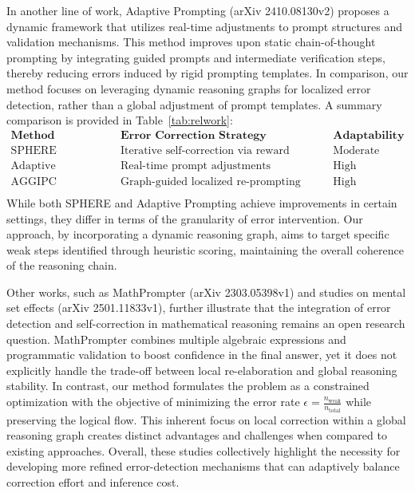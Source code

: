 \documentclass[11pt]{article}
\begin{document}
In another line of work, Adaptive Prompting (arXiv 2410.08130v2) proposes a dynamic framework that utilizes real-time adjustments to prompt structures and validation mechanisms. This method improves upon static chain-of-thought prompting by integrating guided prompts and intermediate verification steps, thereby reducing errors induced by rigid prompting templates. In comparison, our method focuses on leveraging dynamic reasoning graphs for localized error detection, rather than a global adjustment of prompt templates. A summary comparison is provided in Table~\ref{tab:relwork}:
\[
\begin{array}{lcc}
\textbf{Method} & \textbf{Error Correction Strategy} & \textbf{Adaptability} \\
\hline
\text{SPHERE} & \text{Iterative self-correction via reward updates} & \text{Moderate} \\
\text{Adaptive Prompting} & \text{Real-time prompt adjustments} & \text{High} \\
\text{AGGIPC (Proposed)} & \text{Graph-guided localized re-prompting} & \text{High} \\
\end{array}
\]
While both SPHERE and Adaptive Prompting achieve improvements in certain settings, they differ in terms of the granularity of error intervention. Our approach, by incorporating a dynamic reasoning graph, aims to target specific weak steps identified through heuristic scoring, maintaining the overall coherence of the reasoning chain.

Other works, such as MathPrompter (arXiv 2303.05398v1) and studies on mental set effects (arXiv 2501.11833v1), further illustrate that the integration of error detection and self-correction in mathematical reasoning remains an open research question. MathPrompter combines multiple algebraic expressions and programmatic validation to boost confidence in the final answer, yet it does not explicitly handle the trade-off between local re-elaboration and global reasoning stability. In contrast, our method formulates the problem as a constrained optimization with the objective of minimizing the error rate \(\epsilon = \frac{n_{\text{weak}}}{n_{\text{total}}}\) while preserving the logical flow. This inherent focus on local correction within a global reasoning graph creates distinct advantages and challenges when compared to existing approaches. Overall, these studies collectively highlight the necessity for developing more refined error-detection mechanisms that can adaptively balance correction effort and inference cost.
\end{document}
